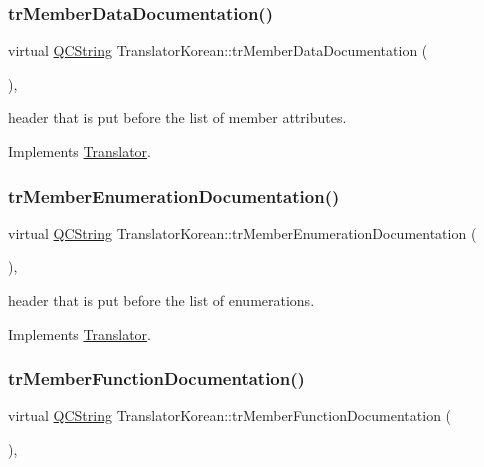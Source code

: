 \subsubsection{\texorpdfstring{trMemberDataDocumentation()}{trMemberDataDocumentation()}}
{\footnotesize\ttfamily virtual \mbox{\hyperlink{class_q_c_string}{Q\+C\+String}} Translator\+Korean\+::tr\+Member\+Data\+Documentation (\begin{DoxyParamCaption}{ }\end{DoxyParamCaption})\hspace{0.3cm}{\ttfamily [inline]}, {\ttfamily [virtual]}}

header that is put before the list of member attributes. 

Implements \mbox{\hyperlink{class_translator}{Translator}}.

\mbox{\label{class_translator_korean_a92809a89f37f709fa100b7723daff4f8}} 
\subsubsection{\texorpdfstring{trMemberEnumerationDocumentation()}{trMemberEnumerationDocumentation()}}
{\footnotesize\ttfamily virtual \mbox{\hyperlink{class_q_c_string}{Q\+C\+String}} Translator\+Korean\+::tr\+Member\+Enumeration\+Documentation (\begin{DoxyParamCaption}{ }\end{DoxyParamCaption})\hspace{0.3cm}{\ttfamily [inline]}, {\ttfamily [virtual]}}

header that is put before the list of enumerations. 

Implements \mbox{\hyperlink{class_translator}{Translator}}.

\mbox{\label{class_translator_korean_aa4b7b176cd22329c6b32b1451d421187}} 
\subsubsection{\texorpdfstring{trMemberFunctionDocumentation()}{trMemberFunctionDocumentation()}}
{\footnotesize\ttfamily virtual \mbox{\hyperlink{class_q_c_string}{Q\+C\+String}} Translator\+Korean\+::tr\+Member\+Function\+Documentation (\begin{DoxyParamCaption}{ }\end{DoxyParamCaption})\hspace{0.3cm}{\ttfamily [inline]}, {\ttfamily [virtual]}}

